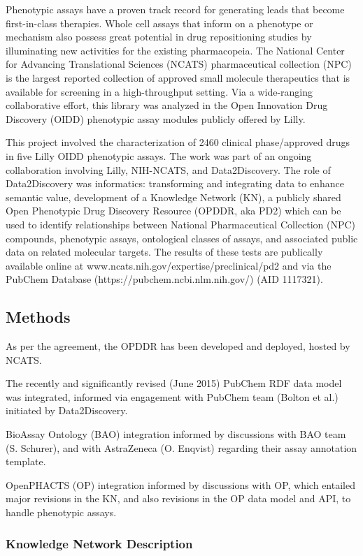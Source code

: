 Phenotypic assays have a proven track record for generating leads that become first-in-class therapies. Whole cell assays that inform on a phenotype or mechanism also possess great potential in drug repositioning studies by illuminating new activities for the existing pharmacopeia. The National Center for Advancing Translational Sciences (NCATS) pharmaceutical collection (NPC) is the largest reported collection of approved small molecule therapeutics that is available for screening in a high-throughput setting. Via a wide-ranging collaborative effort, this library was analyzed in the Open Innovation Drug Discovery (OIDD) phenotypic assay modules publicly offered by Lilly. 

This project involved the characterization of 2460 clinical phase/approved drugs in five Lilly OIDD phenotypic assays. The work was part of an ongoing collaboration involving Lilly, NIH-NCATS, and Data2Discovery.  The role of Data2Discovery was informatics: transforming and integrating data to enhance semantic value, development of a Knowledge Network (KN), a publicly shared Open Phenotypic Drug Discovery Resource (OPDDR, aka PD2) which can be used to identify relationships between National Pharmaceutical Collection (NPC) compounds, phenotypic assays, ontological classes of assays, and associated public data on related molecular targets. The results of these tests are publically available online at www.ncats.nih.gov/expertise/preclinical/pd2 and via the PubChem Database (https://pubchem.ncbi.nlm.nih.gov/) (AID 1117321).

\subsection{Methods}

As per the agreement, the OPDDR has been developed and deployed, hosted by NCATS. 

The recently and significantly revised (June 2015) PubChem RDF data model was integrated, informed via engagement with PubChem team (Bolton et al.) initiated by Data2Discovery.

BioAssay Ontology (BAO) integration informed by discussions with BAO team (S. Schurer), and with AstraZeneca (O. Enqvist) regarding their assay annotation template. 

OpenPHACTS (OP) integration informed by discussions with OP, which entailed major revisions in the KN, and also revisions in the OP data model and API, to handle phenotypic assays. 

\subsubsection{Knowledge Network Description}

